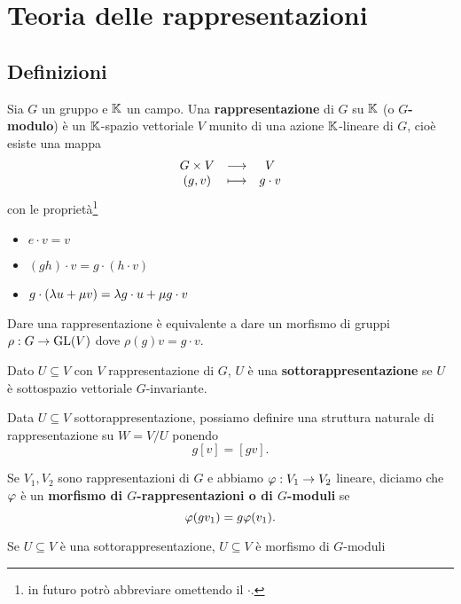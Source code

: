 \chapter{Teoria delle rappresentazioni}

\section{Definizioni}

\begin{definition}[Rappresentazione]
Sia $G$ un gruppo e $\mathbb{K}$ un campo. Una \textbf{rappresentazione} di $G$ su $\mathbb{K}$ (o \textbf{$G$-modulo}) \`e un $\mathbb{K}$-spazio vettoriale $V$ munito di una azione $\mathbb{K}$-lineare di $G$, cio\`e esiste una mappa
\[\begin{array}{ccc} {G\times V} & \longrightarrow & {V}\\ {(g,v)} & \longmapsto & {g\cdot v} \end{array}\]
con le propriet\`a\footnote{in futuro potr\`o abbreviare omettendo il $\cdot$.}
\begin{itemize}
    \item $e\cdot v=v$
    \item $(g h)\cdot v=g\cdot(h\cdot v)$
    \item $g\cdot(\lambda u+\mu v)=\lambda g\cdot u+\mu g\cdot v$
\end{itemize}
\end{definition}
\begin{remark}
    Dare una rappresentazione \`e equivalente a dare un morfismo di gruppi $\rho:G\to \mathrm{GL}(V)$ dove $\rho(g)v=g\cdot v$.
\end{remark}

\begin{definition}[Sottorappresentazione]
Dato $U\subseteq V$ con $V$ rappresentazione di $G$, $U$ \`e una \textbf{sottorappresentazione} se $U$ \`e sottospazio vettoriale $G$-invariante.
\end{definition}
\begin{remark}
Data $U\subseteq V$ sottorappresentazione, possiamo definire una struttura naturale di rappresentazione su $W=V/U$ ponendo
\[g[v]=[gv].\]
\end{remark}

\begin{definition}
Se $V_1,V_2$ sono rappresentazioni di $G$ e abbiamo $\varphi:V_1\to V_2$ lineare, diciamo che $\varphi$ \`e un \textbf{morfismo di $G$-rappresentazioni o di $G$-moduli} se 
\[\varphi(gv_1)=g\varphi(v_1).\]
\end{definition}

\begin{example}
Se $U\subseteq V$ \`e una sottorappresentazione, $U\subseteq V$ \`e morfismo di $G$-moduli
\end{example}

